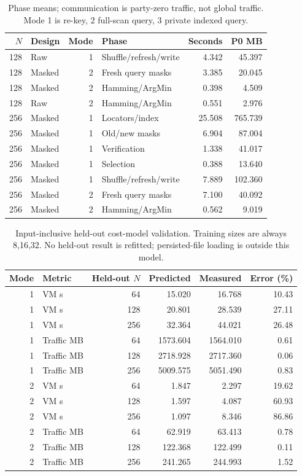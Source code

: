 \begin{table}[H]
\caption{Phase means; communication is party-zero traffic, not global traffic. Mode 1 is re-key, 2 full-scan query, 3 private indexed query.}
\label{tab:phases24}\centering\small
\setlength{\tabcolsep}{3pt}
\begin{tabular}{rlrlrr}
\toprule
$N$ & Design & Mode & Phase & Seconds & P0 MB \\
\midrule
128 & Raw & 1 & Shuffle/refresh/write & 4.342 & 45.397 \\
128 & Masked & 2 & Fresh query masks & 3.385 & 20.045 \\
128 & Masked & 2 & Hamming/ArgMin & 0.398 & 4.509 \\
128 & Raw & 2 & Hamming/ArgMin & 0.551 & 2.976 \\
256 & Masked & 1 & Locators/index & 25.508 & 765.739 \\
256 & Masked & 1 & Old/new masks & 6.904 & 87.004 \\
256 & Masked & 1 & Verification & 1.338 & 41.017 \\
256 & Masked & 1 & Selection & 0.388 & 13.640 \\
256 & Masked & 1 & Shuffle/refresh/write & 7.889 & 102.360 \\
256 & Masked & 2 & Fresh query masks & 7.100 & 40.092 \\
256 & Masked & 2 & Hamming/ArgMin & 0.562 & 9.019 \\
\bottomrule
\end{tabular}
\end{table}

\begin{table}[H]
\caption{Input-inclusive held-out cost-model validation. Training sizes are always 8,16,32. No held-out result is refitted; persisted-file loading is outside this model.}
\label{tab:model}\centering\small
\setlength{\tabcolsep}{3pt}
\begin{tabular}{rlrrrr}
\toprule
Mode & Metric & Held-out $N$ & Predicted & Measured & Error (\%) \\
\midrule
1 & VM s & 64 & 15.020 & 16.768 & 10.43 \\
1 & VM s & 128 & 20.801 & 28.539 & 27.11 \\
1 & VM s & 256 & 32.364 & 44.021 & 26.48 \\
1 & Traffic MB & 64 & 1573.604 & 1564.010 & 0.61 \\
1 & Traffic MB & 128 & 2718.928 & 2717.360 & 0.06 \\
1 & Traffic MB & 256 & 5009.575 & 5051.490 & 0.83 \\
2 & VM s & 64 & 1.847 & 2.297 & 19.62 \\
2 & VM s & 128 & 1.597 & 4.087 & 60.93 \\
2 & VM s & 256 & 1.097 & 8.346 & 86.86 \\
2 & Traffic MB & 64 & 62.919 & 63.413 & 0.78 \\
2 & Traffic MB & 128 & 122.368 & 122.499 & 0.11 \\
2 & Traffic MB & 256 & 241.265 & 244.993 & 1.52 \\
\bottomrule
\end{tabular}
\end{table}

